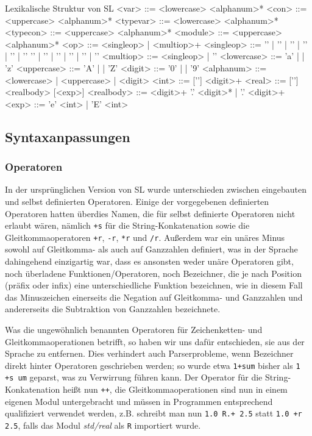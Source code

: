 \documentclass[runningheads]{llncs}
\begin{document}
\begin{grammarfigure}{Lexikalische Struktur von SL}
<var>       ::= <lowercase> <alphanum>*
<con>       ::= <uppercase> <alphanum>*
<typevar>   ::= <lowercase> <alphanum>*
<typecon>   ::= <uppercase> <alphanum>*
<module>    ::= <uppercase> <alphanum>*
<op>        ::= <singleop> | <multiop>+
<singleop>  ::= '\exclamationOp' | '\paragraphOp' | '\percentOp' | '\ampOp' | '\divint' | '\questionOp' 
           \alt '\addint' | '\mulint' | '\sharpOp' | '\subint' | '\ltint' | '\gtint'
<multiop>   ::= <singleop> | '\eq'
<lowercase> ::= 'a' | \cdots | 'z'
<uppercase> ::= 'A' | \cdots | 'Z'
<digit>     ::= '0' | \cdots | '9'
<alphanum>  ::= <lowercase> | <uppercase> | <digit>
<int>       ::= ['\subint'] <digit>+
<real>      ::= ['\subint'] <realbody> [<exp>]
<realbody>  ::= <digit>+ '.' <digit>* | '.' <digit>+
<exp>       ::= 'e' <int> | 'E' <int>
\end{grammarfigure}

\subsection{Syntaxanpassungen}

\subsubsection{Operatoren}

In der ursprünglichen Version von SL wurde unterschieden zwischen
eingebauten und selbst definierten Operatoren. Einige der vorgegebenen
definierten Operatoren hatten überdies Namen, die für selbst
definierte Operatoren nicht erlaubt wären, nämlich \verb|+s| für die
String-Konkatenation sowie die Gleitkommaoperatoren \verb|+r|,
\verb|-r|, \verb|*r| und \verb|/r|. Außerdem war ein unäres Minus
sowohl auf Gleitkomma- als auch auf Ganzzahlen definiert, was in der
Sprache dahingehend einzigartig war, dass es ansonsten weder unäre
Operatoren gibt, noch überladene Funktionen/Operatoren, noch
Bezeichner, die je nach Position (präfix oder infix) eine
unterschiedliche Funktion bezeichnen, wie in diesem Fall das
Minuszeichen einerseits die Negation auf Gleitkomma- und Ganzzahlen
und andererseits die Subtraktion von Ganzzahlen bezeichnete.

Was die ungewöhnlich benannten Operatoren für Zeichenketten- und
Gleitkommaoperationen betrifft, so haben wir uns dafür entschieden, sie
aus der Sprache zu entfernen.  Dies verhindert auch Parserprobleme,
wenn Bezeichner direkt hinter Operatoren geschrieben werden; so wurde
etwa \verb|1+sum| bisher als \verb|1 +s um| geparst, was zu Verwirrung
führen kann.  Der Operator für die String-Konkatenation heißt nun
\verb|++|, die Gleitkommaoperationen sind nun in einem eigenen Modul
untergebracht und müssen in Programmen entsprechend qualifiziert
verwendet werden, z.B. schreibt man nun \verb|1.0 R.+ 2.5| statt
\verb|1.0 +r 2.5|, falls das Modul \emph{std/real} als \verb|R|
importiert wurde.
\end{document}
